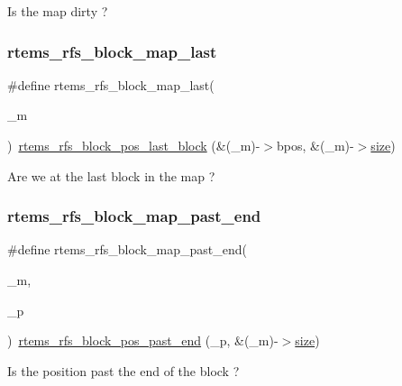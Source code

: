 Is the map dirty ? \mbox{\label{rtems-rfs-block_8h_aa8c216119709425d653004badbdd112f}} 
\subsubsection{\texorpdfstring{rtems\_rfs\_block\_map\_last}{rtems\_rfs\_block\_map\_last}}
{\footnotesize\ttfamily \#define rtems\+\_\+rfs\+\_\+block\+\_\+map\+\_\+last(\begin{DoxyParamCaption}\item[{}]{\+\_\+m }\end{DoxyParamCaption})~\mbox{\hyperlink{rtems-rfs-block-pos_8h_af9de1169214c5fbc1d5cbb8265e4b759}{rtems\+\_\+rfs\+\_\+block\+\_\+pos\+\_\+last\+\_\+block}} (\&(\+\_\+m)-\/$>$bpos, \&(\+\_\+m)-\/$>$\mbox{\hyperlink{sun4u_2tte_8h_a245260f6f74972558f61b85227df5aae}{size}})}

Are we at the last block in the map ? \mbox{\label{rtems-rfs-block_8h_ae63fea18cd527d6b6c5049d7f36196c4}} 
\subsubsection{\texorpdfstring{rtems\_rfs\_block\_map\_past\_end}{rtems\_rfs\_block\_map\_past\_end}}
{\footnotesize\ttfamily \#define rtems\+\_\+rfs\+\_\+block\+\_\+map\+\_\+past\+\_\+end(\begin{DoxyParamCaption}\item[{}]{\+\_\+m,  }\item[{}]{\+\_\+p }\end{DoxyParamCaption})~\mbox{\hyperlink{rtems-rfs-block-pos_8h_a7c9df0abcb57dfe35e4e18ae63356077}{rtems\+\_\+rfs\+\_\+block\+\_\+pos\+\_\+past\+\_\+end}} (\+\_\+p, \&(\+\_\+m)-\/$>$\mbox{\hyperlink{sun4u_2tte_8h_a245260f6f74972558f61b85227df5aae}{size}})}

Is the position past the end of the block ? \mbox{\label{rtems-rfs-block_8h_a08acb6d8355c8533a760c9dffa3598fa}} 
